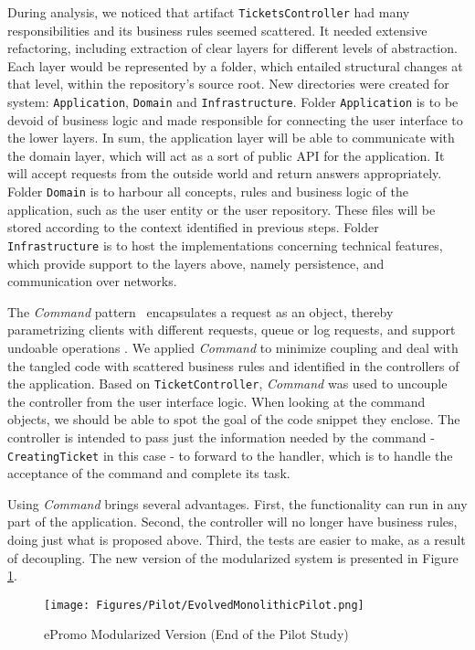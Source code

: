 \documentclass[a4paper,twoside]{article}
\begin{document}
During analysis, we noticed that artifact \texttt{TicketsController} had many responsibilities and its business rules seemed scattered. It needed extensive refactoring, including extraction of clear layers for different levels of abstraction. Each layer would be represented by a folder, which entailed structural changes at that level, within the repository's source root. New directories were created for system: \texttt{Application}, \texttt{Domain} and \texttt{Infrastructure}. Folder \texttt{Application} is to be devoid of business logic and made responsible for connecting the user interface to the lower layers. In sum, the application layer will be able to communicate with the domain layer, which will act as a sort of public API for the application. It will accept requests from the outside world and return answers appropriately. Folder \texttt{Domain} is to harbour all concepts, rules and business logic of the application, such as the user entity or the user repository. These files will be stored according to the context identified in previous steps. Folder \texttt{Infrastructure} is to host the implementations concerning technical features, which provide support to the layers above, namely persistence, and communication over networks.

The \textit{Command} pattern~\cite{gamma1995design} encapsulates a request as an object, thereby parametrizing clients with different requests, queue or log requests, and support undoable operations \cite{gamma1995design}. We applied \textit{Command} to minimize coupling and deal with the tangled code with scattered business rules and identified in the controllers of the application. Based on \texttt{TicketController}, \textit{Command} was used to uncouple the controller from the user interface logic. When looking at the command objects, we should be able to spot the goal of the code snippet they enclose. The controller is intended to pass just the information needed by the command - \texttt{CreatingTicket} in this case - to forward to the handler, which is to handle the acceptance of the command and complete its task.

Using \textit{Command} brings several advantages. First, the functionality can run in any part of the application. Second, the controller will no longer have business rules, doing just what is proposed above. Third, the tests are easier to make, as a result of decoupling. The new version of the modularized system is presented in Figure \ref{fig:ePromoModular}.

\begin{figure}
\centering
\texttt{[image: Figures/Pilot/EvolvedMonolithicPilot.png]}
\caption{ePromo Modularized Version (End of the Pilot Study) \cite{henriqueITNG2019expReport}}
\label{fig:ePromoModular}
\end{figure}
\end{document}

